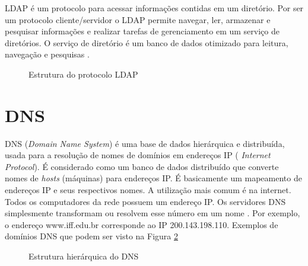 LDAP é um protocolo para acessar informações contidas em um diretório. Por ser um protocolo cliente/servidor o LDAP permite navegar, ler, armazenar e pesquisar informações e realizar tarefas de gerenciamento em um serviço de diretórios. O serviço de diretório é um banco de dados otimizado para leitura, navegação e pesquisas \cite{TRIGO}.

\begin{figure}[ht]
   	\centering
   	\caption{Estrutura do protocolo LDAP \cite{LDAP}}
    \label{ldap}
\end{figure}

\section{DNS}

DNS (\textit{Domain Name System}) é uma base de dados hierárquica e distribuída, usada para a resolução de nomes de domínios em endereços IP (\textit{ Internet Protocol}). É considerado como um banco de dados distribuído que converte nomes de \textit{hosts} (máquinas) para endereços IP. É basicamente um mapeamento de endereços IP e seus respectivos nomes. A utilização mais comum é na internet. Todos os computadores da rede possuem um endereço IP. Os servidores DNS simplesmente transformam ou resolvem esse número em um nome \cite{SCRIMER}. Por exemplo, o endereço www.iff.edu.br corresponde ao IP 200.143.198.110. Exemplos de domínios DNS que podem ser visto na Figura \ref{dns}

\begin{figure}[ht]
   	\centering
   	\caption{Estrutura hierárquica do DNS \cite{DNS}}
    \label{dns}
\end{figure}

